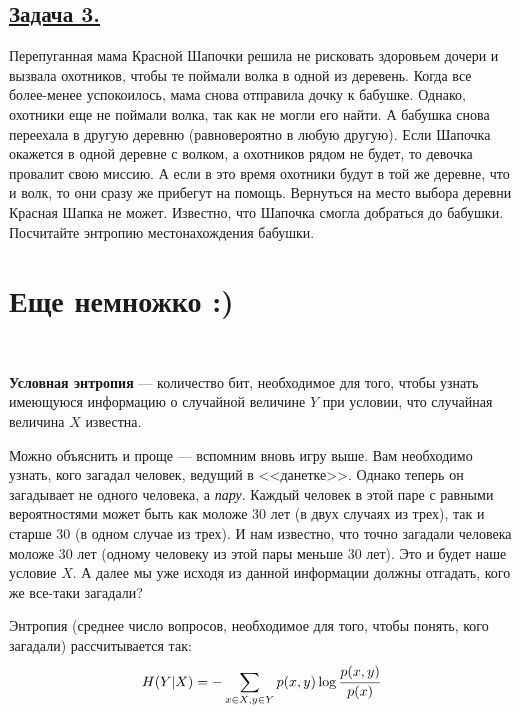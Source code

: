 \subsection*{\hyperref[sec:sol_problem3]{Задача 3.}}\label{sec:problem3} Перепуганная мама Красной Шапочки решила не рисковать здоровьем дочери и вызвала охотников, чтобы те поймали волка в одной из деревень. Когда все более-менее успокоилось, мама снова отправила дочку к бабушке. Однако, охотники еще не поймали волка, так как не могли его найти. А бабушка снова переехала в другую деревню (равновероятно в любую другую). Если Шапочка окажется в одной деревне с волком, а охотников рядом не будет, то девочка провалит свою миссию. А если в это время охотники будут в той же деревне, что и волк, то они сразу же прибегут на помощь. Вернуться на место выбора деревни Красная Шапка не может. Известно, что Шапочка смогла добраться до бабушки. Посчитайте энтропию местонахождения бабушки.

\section*{Еще немножко :)}~\
\\

\begin{siderules}
    \textbf{Условная энтропия} --- количество бит, необходимое для того, чтобы узнать имеющуюся информацию о случайной величине $Y$ при условии, что случайная величина $X$ известна.
\end{siderules}

Можно объяснить и проще --- вспомним вновь игру выше. Вам необходимо узнать, кого загадал человек, ведущий в <<данетке>>. Однако теперь он загадывает не одного человека, а \textit{пару}. Каждый человек в этой паре с равными вероятностями может быть как моложе 30 лет (в двух случаях из трех), так и старше 30 (в одном случае из трех). И нам известно, что точно загадали человека моложе 30 лет (одному человеку из этой пары меньше 30 лет). Это и будет наше условие $X$. А далее мы уже исходя из данной информации должны отгадать, кого же все-таки загадали?

Энтропия (среднее число вопросов, необходимое для того, чтобы понять, кого загадали) рассчитывается так:
\[H(Y|X)=-\sum\limits_{x\in X, y\in Y} p(x, y)\log \cfrac{p(x, y)}{p(x)} \]


